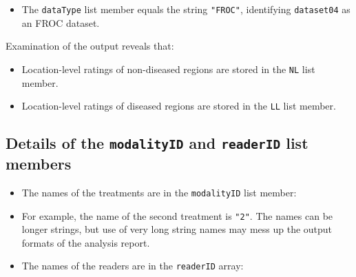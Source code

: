 \documentclass[]{book}
\newenvironment{Shaded}{\begin{snugshade}}{\end{snugshade}}
\newcommand{\CommentTok}[1]{\textcolor[rgb]{0.56,0.35,0.01}{\textit{#1}}}
\newcommand{\KeywordTok}[1]{\textcolor[rgb]{0.13,0.29,0.53}{\textbf{#1}}}
\newcommand{\NormalTok}[1]{#1}
\newcommand{\OperatorTok}[1]{\textcolor[rgb]{0.81,0.36,0.00}{\textbf{#1}}}
\providecommand{\tightlist}{%
  \setlength{\itemsep}{0pt}\setlength{\parskip}{0pt}}
\begin{document}
\begin{itemize}
\tightlist
\item
  The \texttt{dataType} list member equals the string \texttt{"FROC"}, identifying \texttt{dataset04} as an FROC dataset.
\end{itemize}

Examination of the output reveals that:

\begin{itemize}
\tightlist
\item
  Location-level ratings of non-diseased regions are stored in the \texttt{NL} list member.
\item
  Location-level ratings of diseased regions are stored in the \texttt{LL} list member.
\end{itemize}

\hypertarget{details-of-the-modalityid-and-readerid-list-members-1}{%
\subsection{\texorpdfstring{Details of the \texttt{modalityID} and \texttt{readerID} list members}{Details of the modalityID and readerID list members}}\label{details-of-the-modalityid-and-readerid-list-members-1}}

\begin{itemize}
\tightlist
\item
  The names of the treatments are in the \texttt{modalityID} list member:
\end{itemize}

\begin{Shaded}
\end{Shaded}

\begin{itemize}
\item
  For example, the name of the second treatment is \texttt{"2"}. The names can be longer strings, but use of very long string names may mess up the output formats of the analysis report.
\item
  The names of the readers are in the \texttt{readerID} array:
\end{itemize}

\begin{Shaded}
\end{Shaded}
\end{document}
